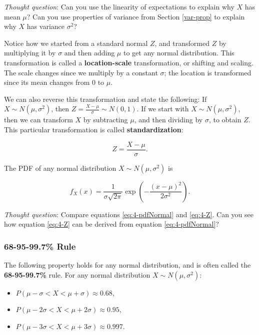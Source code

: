 \documentclass[
]{book}
\providecommand{\tightlist}{%
  \setlength{\itemsep}{0pt}\setlength{\parskip}{0pt}}
\begin{document}
\emph{Thought question}: Can you use the linearity of expectations to explain why \(X\) has mean \(\mu\)? Can you use properties of variance from Section \ref{var-prop} to explain why \(X\) has variance \(\sigma^2\)?

Notice how we started from a standard normal \(Z\), and transformed \(Z\) by multiplying it by \(\sigma\) and then adding \(\mu\) to get any normal distribution. This transformation is called a \textbf{location-scale} transformation, or shifting and scaling. The scale changes since we multiply by a constant \(\sigma\); the location is transformed since its mean changes from 0 to \(\mu\).

We can also reverse this transformation and state the following: If \(X \sim N(\mu, \sigma^2)\), then \(Z = \frac{X-\mu}{\sigma} \sim N(0,1)\). If we start with \(X \sim N(\mu, \sigma^2)\), then we can transform \(X\) by subtracting \(\mu\), and then dividing by \(\sigma\), to obtain \(Z\). This particular transformation is called \textbf{standardization}:

\begin{equation} 
Z = \frac{X-\mu}{\sigma}.
\label{eq:4-standardize}
\end{equation}

The PDF of any normal distribution \(X \sim N(\mu, \sigma^2)\) is

\begin{equation} 
f_X(x) = \frac{1}{\sigma \sqrt{2 \pi}} \exp \left(-\frac{(x - \mu)^2}{2 \sigma^2} \right).
\label{eq:4-pdfNormal}
\end{equation}

\emph{Thought question}: Compare equations \eqref{eq:4-pdfNormal} and \eqref{eq:4-Z}. Can you see how equation \eqref{eq:4-Z} can be derived from equation \eqref{eq:4-pdfNormal}?

\hypertarget{rulenorm}{%
\subsubsection{68-95-99.7\% Rule}\label{rulenorm}}

The following property holds for any normal distribution, and is often called the \textbf{68-95-99.7\%} rule. For any normal distribution \(X \sim N(\mu, \sigma^2)\):

\begin{itemize}
\tightlist
\item
  \(P(\mu - \sigma < X < \mu + \sigma) \approx 0.68\),
\item
  \(P(\mu - 2\sigma < X < \mu + 2\sigma) \approx 0.95\),
\item
  \(P(\mu - 3\sigma < X < \mu + 3\sigma) \approx 0.997\).
\end{itemize}
\end{document}
